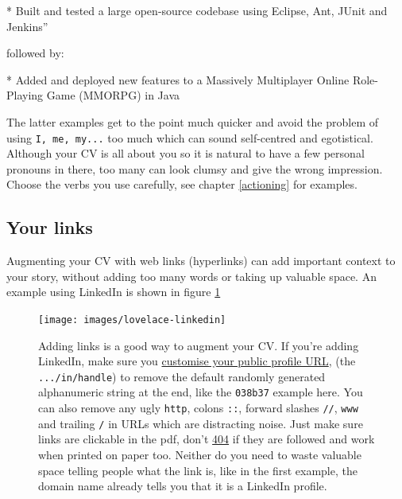 \documentclass[
]{book}
\newenvironment{Shaded}{\begin{snugshade}}{\end{snugshade}}
\newcommand{\NormalTok}[1]{#1}
\newcommand{\SpecialStringTok}[1]{\textcolor[rgb]{0.31,0.60,0.02}{#1}}
\begin{document}
\begin{Shaded}
\begin{Highlighting}[]
\SpecialStringTok{* }\NormalTok{Built and tested a large open{-}source codebase using Eclipse, Ant, JUnit and Jenkins”}
\end{Highlighting}
\end{Shaded}

followed by:

\begin{Shaded}
\begin{Highlighting}[]
\SpecialStringTok{* }\NormalTok{Added and deployed new features to a Massively Multiplayer Online Role{-}Playing Game (MMORPG) in Java}
\end{Highlighting}
\end{Shaded}

The latter examples get to the point much quicker and avoid the problem of using \texttt{I,\ me,\ my...} too much which can sound self-centred and egotistical. Although your CV is all about you so it is natural to have a few personal pronouns in there, too many can look clumsy and give the wrong impression. Choose the verbs you use carefully, see chapter \ref{actioning} for examples.

\hypertarget{links}{%
\subsection{Your links}\label{links}}

Augmenting your CV with web links (hyperlinks) can add important context to your story, without adding too many words or taking up valuable space. An example using LinkedIn is shown in figure \ref{fig:lovelace-fig}

\begin{figure}

{\centering \texttt{[image: images/lovelace-linkedin]} 

}

\caption{Adding links is a good way to augment your CV. If you're adding LinkedIn, make sure you \href{https://www.linkedin.com/help/linkedin/topics/6042/6054/87}{customise your public profile URL}, (the \texttt{.../in/handle}) to remove the default randomly generated alphanumeric string at the end, like the \texttt{038b37} example here. \citep{customlinkedin} You can also remove any ugly \texttt{http}, colons \texttt{::}, forward slashes \texttt{//}, \texttt{www} and trailing \texttt{/} in URLs which are distracting noise. Just make sure links are clickable in the pdf, don't \href{https://en.wikipedia.org/wiki/HTTP_404}{404} if they are followed and work when printed on paper too. Neither do you need to waste valuable space telling people what the link is, like in the first example, the domain name already tells you that it is a LinkedIn profile.}\label{fig:lovelace-fig}
\end{figure}
\end{document}
